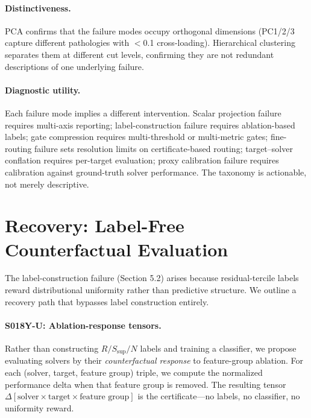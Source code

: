 \documentclass{article}
\begin{document}
\paragraph{Distinctiveness.} PCA confirms that the failure modes occupy orthogonal dimensions (PC1/2/3 capture different pathologies with $<$0.1 cross-loading). Hierarchical clustering separates them at different cut levels, confirming they are not redundant descriptions of one underlying failure.

\paragraph{Diagnostic utility.} Each failure mode implies a different intervention. Scalar projection failure requires multi-axis reporting; label-construction failure requires ablation-based labels; gate compression requires multi-threshold or multi-metric gates; fine-routing failure sets resolution limits on certificate-based routing; target--solver conflation requires per-target evaluation; proxy calibration failure requires calibration against ground-truth solver performance. The taxonomy is actionable, not merely descriptive.

\section{Recovery: Label-Free Counterfactual Evaluation}

The label-construction failure (Section 5.2) arises because residual-tercile labels reward distributional uniformity rather than predictive structure. We outline a recovery path that bypasses label construction entirely.

\paragraph{S018Y-U: Ablation-response tensors.} Rather than constructing $R/S_{\text{sup}}/N$ labels and training a classifier, we propose evaluating solvers by their \emph{counterfactual response} to feature-group ablation. For each (solver, target, feature group) triple, we compute the normalized performance delta when that feature group is removed. The resulting tensor $\Delta[\text{solver} \times \text{target} \times \text{feature group}]$ is the certificate---no labels, no classifier, no uniformity reward.
\end{document}
